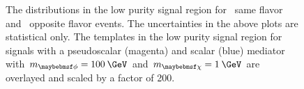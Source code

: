 \begin{figure}
  \caption{The \ptmiss distributions in the low purity signal region for~\protect{} same flavor and~\protect{} opposite flavor events. The uncertainties in the above plots are statistical only. The \ptmiss templates in the low purity signal region for signals with a pseudoscalar (magenta) and scalar (blue) mediator with $\mMed=100\:\GeV$ and $\mDM=1\:\GeV$ are overlayed and scaled by a factor of 200.}
  \label{fig:metlo}
\end{figure}

